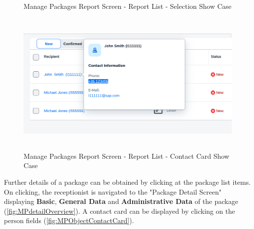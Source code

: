\begin{figure}[htb!]
	\centering
	\hspace{5pt}
    \caption{Manage Packages Report Screen - Report List - Selection Show Case}
	\label{fig:MPListSelection}
\end{figure}

\begin{figure}[htb]
	\centering
	\includegraphics[height=200pt]{images/user_doc/managePack/ReportScreen/browse/contactcard.png}
	\caption{Manage Packages Report Screen - Report List - Contact Card Show Case}
	\label{fig:MPReportCOntactCard}
\end{figure}

Further details of a package can be obtained by clicking at the package list items. On clicking, the receptionist is navigated to the "Package Detail Screen" displaying \textbf{Basic}, \textbf{General Data} and \textbf{Administrative Data} of the package (\autoref{fig:MPdetailOverview}). 
A contact card can be displayed by clicking on the person fields (\autoref{fig:MPObjectContactCard}). 

